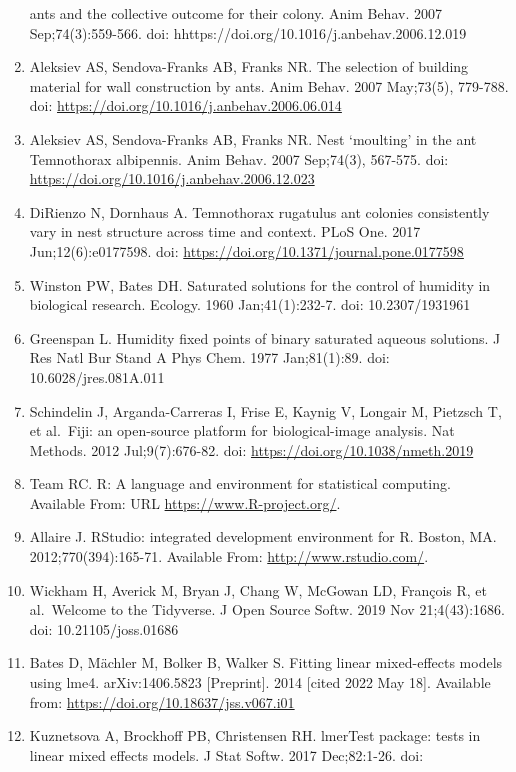 \documentclass[3p]{elsarticle} %
\begin{document}
\begin{enumerate}
  ants and the collective outcome for their colony. Anim Behav. 2007
  Sep;74(3):559-566. doi: hhttps://doi.org/10.1016/j.anbehav.2006.12.019
\item
  Aleksiev AS, Sendova-Franks AB, Franks NR. The selection of building
  material for wall construction by ants. Anim Behav. 2007 May;73(5),
  779-788. doi: \url{https://doi.org/10.1016/j.anbehav.2006.06.014}
\item
  Aleksiev AS, Sendova-Franks AB, Franks NR. Nest `moulting' in the ant
  Temnothorax albipennis. Anim Behav. 2007 Sep;74(3), 567-575. doi:
  \url{https://doi.org/10.1016/j.anbehav.2006.12.023}
\item
  DiRienzo N, Dornhaus A. Temnothorax rugatulus ant colonies
  consistently vary in nest structure across time and context. PLoS One.
  2017 Jun;12(6):e0177598. doi:
  \url{https://doi.org/10.1371/journal.pone.0177598}
\item
  Winston PW, Bates DH. Saturated solutions for the control of humidity
  in biological research. Ecology. 1960 Jan;41(1):232-7. doi:
  10.2307/1931961
\item
  Greenspan L. Humidity fixed points of binary saturated aqueous
  solutions. J Res Natl Bur Stand A Phys Chem. 1977 Jan;81(1):89. doi:
  10.6028/jres.081A.011
\item
  Schindelin J, Arganda-Carreras I, Frise E, Kaynig V, Longair M,
  Pietzsch T, et al.~Fiji: an open-source platform for biological-image
  analysis. Nat Methods. 2012 Jul;9(7):676-82. doi:
  \url{https://doi.org/10.1038/nmeth.2019}
\item
  Team RC. R: A language and environment for statistical computing.
  Available From: URL \url{https://www.R-project.org/}.
\item
  Allaire J. RStudio: integrated development environment for R. Boston,
  MA. 2012;770(394):165-71. Available From:
  \url{http://www.rstudio.com/}.
\item
  Wickham H, Averick M, Bryan J, Chang W, McGowan LD, François R, et
  al.~Welcome to the Tidyverse. J Open Source Softw. 2019 Nov
  21;4(43):1686. doi: 10.21105/joss.01686
\item
  Bates D, Mächler M, Bolker B, Walker S. Fitting linear mixed-effects
  models using lme4. arXiv:1406.5823 {[}Preprint{]}. 2014 {[}cited 2022
  May 18{]}. Available from: \url{https://doi.org/10.18637/jss.v067.i01}
\item
  Kuznetsova A, Brockhoff PB, Christensen RH. lmerTest package: tests in
  linear mixed effects models. J Stat Softw. 2017 Dec;82:1-26. doi:

\end{enumerate}
\end{document}
